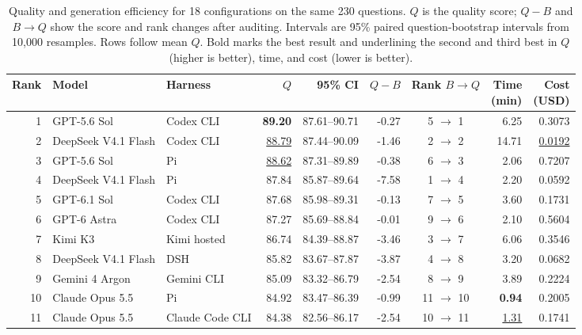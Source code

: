 \begin{table}[H]
\centering
\caption{Quality and generation efficiency for 18 configurations on the same 230 questions. $Q$ is the quality score; $Q-B$ and $B\to Q$ show the score and rank changes after auditing. Intervals are 95\% paired question-bootstrap intervals from 10,000 resamples. Rows follow mean $Q$. Bold marks the best result and underlining the second and third best in $Q$ (higher is better), time, and cost (lower is better).}
\label{tab:main}
\small
\renewcommand{\arraystretch}{0.95}
\setlength{\tabcolsep}{1pt}
\begin{tabular*}{\textwidth}{@{\extracolsep{\fill}}rllrrrcrr@{}}
\toprule
Rank & Model & Harness & {\boldmath$Q$} & 95\% CI & $Q-B$ & \makecell{Rank\\$B\to Q$} & \makecell{Time\\(min)} & \makecell{Cost\\(USD)} \\
\midrule
1 & GPT-5.6 Sol & Codex CLI & \textbf{89.20} & 87.61--90.71 & -0.27 & 5 $\rightarrow$ 1 & 6.25 & 0.3073 \\
2 & DeepSeek V4.1 Flash & Codex CLI & \underline{88.79} & 87.44--90.09 & -1.46 & 2 $\rightarrow$ 2 & 14.71 & \underline{0.0192} \\
3 & GPT-5.6 Sol & Pi & \underline{88.62} & 87.31--89.89 & -0.38 & 6 $\rightarrow$ 3 & 2.06 & 0.7207 \\
4 & DeepSeek V4.1 Flash & Pi & 87.84 & 85.87--89.64 & -7.58 & 1 $\rightarrow$ 4 & 2.20 & 0.0592 \\
5 & GPT-6.1 Sol & Codex CLI & 87.68 & 85.98--89.31 & -0.13 & 7 $\rightarrow$ 5 & 3.60 & 0.1731 \\
6 & GPT-6 Astra & Codex CLI & 87.27 & 85.69--88.84 & -0.01 & 9 $\rightarrow$ 6 & 2.10 & 0.5604 \\
7 & Kimi K3 & Kimi hosted & 86.74 & 84.39--88.87 & -3.46 & 3 $\rightarrow$ 7 & 6.06 & 0.3546 \\
8 & DeepSeek V4.1 Flash & DSH & 85.82 & 83.67--87.87 & -3.87 & 4 $\rightarrow$ 8 & 3.20 & 0.0682 \\
9 & Gemini 4 Argon & Gemini CLI & 85.09 & 83.32--86.79 & -2.54 & 8 $\rightarrow$ 9 & 3.89 & 0.2224 \\
10 & Claude Opus 5.5 & Pi & 84.92 & 83.47--86.39 & -0.99 & 11 $\rightarrow$ 10 & \textbf{0.94} & 0.2005 \\
11 & Claude Opus 5.5 & Claude Code CLI & 84.38 & 82.56--86.17 & -2.54 & 10 $\rightarrow$ 11 & \underline{1.31} & 0.1741 \\

\end{tabular*}
\end{table}
